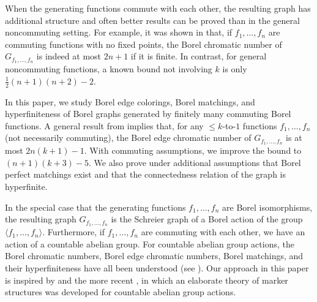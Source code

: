 \documentclass[11pt, reqno, a4paper]{amsart}
\theoremstyle{definition}
\theoremstyle{plain}
\begin{document}
When the generating functions commute with each other, 
the resulting graph has additional structure and often better results can be proved than in the general noncommuting setting. For example, it was shown in \cite{Palamourdas2012,MeehanPalamourdas2021} that, if $f_1, \dots, f_n$ are commuting functions with no fixed points, the Borel chromatic number of $G_{f_1,\dots, f_n}$ is indeed at most $2n+1$ if it is finite. In contrast, for general noncommuting functions, a known bound not involving $k$ is only $\frac{1}{2}(n+1)(n+2)-2$.

In this paper, we study Borel edge colorings, Borel matchings, and hyperfiniteness of Borel graphs generated by finitely many commuting Borel functions. A general result from \cite{KechrisSoleckiTodorcevic1999} implies that, for any $\leq\!k$-to-$1$ functions $f_1, \dots, f_n$ (not necessarily commuting), the Borel edge chromatic number of $G_{f_1,\dots, f_n}$ is at most $2n(k+1)-1$.  With commuting assumptions, we improve the bound to $(n+1)(k+3)-5$.  We also prove under additional assumptions that Borel perfect matchings exist and that the connectedness relation of the graph is hyperfinite. 

In the special case that the generating functions $f_1,\dots, f_n$ are Borel isomorphisms, the resulting graph $G_{f_1,\dots, f_n}$ is the Schreier graph of a Borel action of the group $\langle f_1, \dots, f_n\rangle$. Furthermore, if $f_1,\dots, f_n$ are commuting with each other, we have an action of a countable abelian group. For countable abelian group actions, the Borel chromatic numbers, Borel edge chromatic numbers, Borel matchings, and their hyperfiniteness have all been understood (see \cite{JacksonKechrisLouveau2002, GaoJackson2015, GaoJacksonKrohneSeward2024, ConleyJacksonMarksSewardTuckerDrob2020, Bencs2021FactorIID, GrebikRozhon2023LocalProblems, Weilacher2024, BorelFactorsSubshifts2025}). Our approach in this paper is inspired by \cite{GaoJackson2015} and the more recent \cite{GaoJacksonKrohneSeward2024}, in which an elaborate theory of marker structures was developed for countable abelian group actions. 
\end{document}
